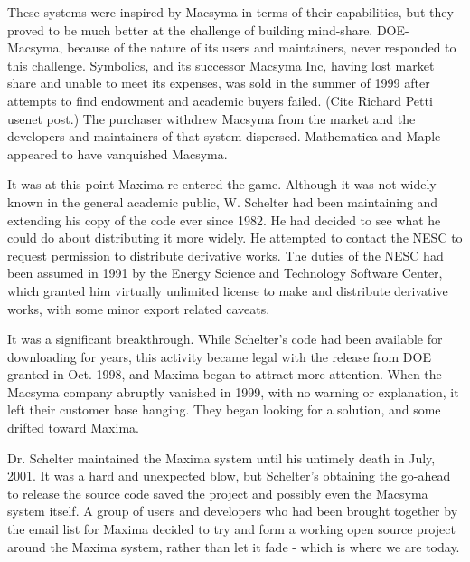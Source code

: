 These systems were inspired by Macsyma in terms of their 
capabilities, but they proved to be much better at the challenge of building
mind-share.  DOE-Macsyma, because of the nature of its users and maintainers, never 
responded to this challenge. Symbolics, and its successor Macsyma Inc, having 
lost market share and unable to meet its expenses, was sold in the summer of 
1999 after attempts to find endowment and academic buyers failed. (Cite Richard
Petti usenet post.)  The purchaser withdrew Macsyma from the market 
and the developers and maintainers of that system dispersed. Mathematica and Maple
appeared to have vanquished Macsyma.

It was at this point Maxima re-entered the game.  Although it was not
widely known in the general academic public, W. Schelter had been
maintaining and extending his copy of the code ever since 1982. He 
had decided to see what he could do about distributing it more widely.  
He attempted to contact the NESC to request permission to distribute
derivative works.  The duties of the NESC had been assumed in 1991 by
the Energy Science and Technology Software Center, which granted him
virtually unlimited license to make and distribute derivative works,
with some minor export related caveats.  

It was a significant breakthrough.  While Schelter's code had been available 
for downloading for years, this 
activity became legal with the release from DOE granted in Oct. 1998, and
Maxima began to attract more attention.  
When the Macsyma company abruptly vanished in 1999, with no warning or
explanation, it left their customer base hanging.  They began looking
for a solution, and some drifted toward Maxima.

Dr. Schelter maintained the Maxima system until his untimely death in
July, 2001. It was a hard and unexpected blow, but Schelter's obtaining
the go-ahead to release the source code saved the project and possibly
even the Macsyma system itself. A group of users and developers who 
had been brought together by the email list for Maxima decided to try and
form a working open source project around the Maxima system, rather
than let it fade - which is where we are today.

